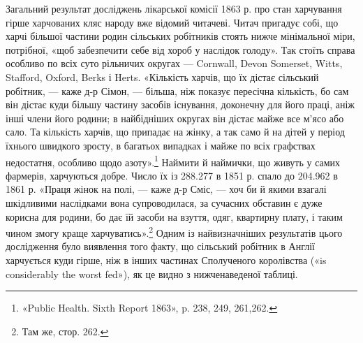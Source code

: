 Загальний результат досліджень лікарської комісії 1863 р.
про стан харчування гірше харчованих кляс народу вже відомий
читачеві. Читач пригадує собі, що харчі більшої частини родин
сільських робітників стоять нижче мінімальної міри, потрібної,
«щоб забезпечити себе від хороб у наслідок голоду». Так стоїть
справа особливо по всіх суто рільничих округах — Cornwall, Devon
Somerset, Witts, Stafford, Oxford, Berks і Herts. «Кількість
харчів, що їх дістає сільський робітник, — каже д-р Сімон, —
більша, ніж показує пересічна кількість, бо сам він дістає куди
більшу частину засобів існування, доконечну для його праці,
аніж інші члени його родини; в найбідніших округах він дістає
майже все м’ясо або сало. Та кількість харчів, що припадає на
жінку, а так само й на дітей у період їхнього швидкого зросту,
в багатьох випадках і майже по всіх графствах недостатня, особливо
щодо азоту».\footnote{
«Public Health. Sixth Report 1863», p. 238, 249, 261,262.
} Наймити й наймички, що живуть у самих
фармерів, харчуються добре. Число їх із 288.277 в 1851 р. спало
до 204.962 в 1861 р. «Праця жінок на полі, — каже д-р Сміс, —
хоч би й якими взагалі шкідливими наслідками вона супроводилася,
за сучасних обставин є дуже корисна для родини, бо дає
їй засоби на взуття, одяг, квартирну плату, і таким чином змогу
краще харчуватись».\footnote{
Там же, стор. 262.
} Одним із найвизначніших результатів
цього дослідження було виявлення того факту, що сільський
робітник в Англії харчується куди гірше, ніж в інших частинах
Сполученого королівства («is considerably the worst fed»), як
це видно з нижченаведеної таблиці.

